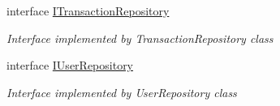 \begin{DoxyCompactItemize}
interface \mbox{\hyperlink{interface_gielda_l2_1_1_d_b_1_1_interfaces_1_1_i_transaction_repository}{I\+Transaction\+Repository}}
\begin{DoxyCompactList}\small\item\em Interface implemented by Transaction\+Repository class \end{DoxyCompactList}\item 
interface \mbox{\hyperlink{interface_gielda_l2_1_1_d_b_1_1_interfaces_1_1_i_user_repository}{I\+User\+Repository}}
\begin{DoxyCompactList}\small\item\em Interface implemented by User\+Repository class \end{DoxyCompactList}\end{DoxyCompactItemize}
